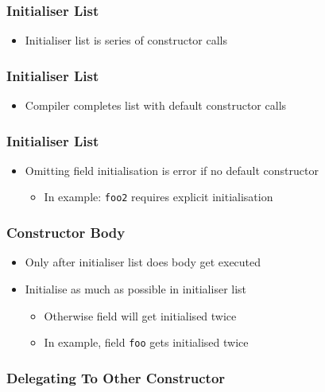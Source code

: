 \begin{frame}
  \frametitle{Initialiser List}
  \begin{itemize}
    \item Initialiser list is series of constructor calls
  \end{itemize}
\end{frame}

\begin{frame}
  \frametitle{Initialiser List}
  \begin{itemize}
    \item Compiler completes list with default constructor calls
  \end{itemize}
\end{frame}

\begin{frame}
  \frametitle{Initialiser List}
  \begin{itemize}
    \item Omitting field initialisation is error if no default constructor
          \begin{itemize}
            \item In example: \texttt{foo2} requires explicit initialisation
          \end{itemize}
  \end{itemize}
\end{frame}

\begin{frame}
  \frametitle{Constructor Body}
  \begin{itemize}
    \item Only after initialiser list does body get executed
    \item Initialise as much as possible in initialiser list
          \begin{itemize}
            \item Otherwise field will get initialised twice
            \item In example, field \texttt{foo} gets initialised twice
          \end{itemize}
  \end{itemize}
\end{frame}

\begin{frame}
  \frametitle{Delegating To Other Constructor}
\end{frame}


